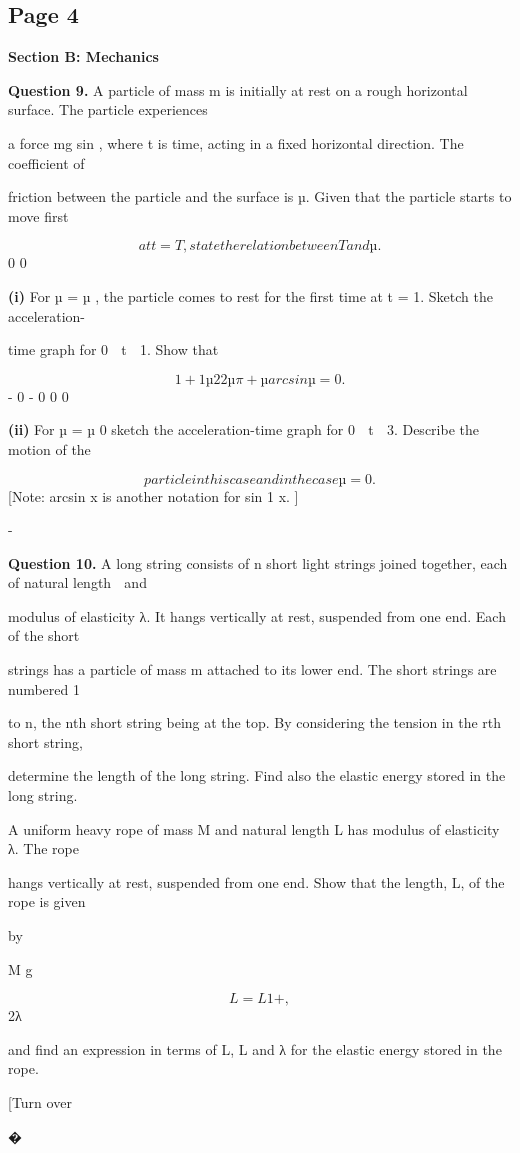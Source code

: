 \documentclass[12pt]{article}
\begin{document}
\subsection*{Page 4}
\begin{flushleft}
\bigskip\textbf{Section B: Mechanics}\par
\bigskip\textbf{Question 9.} A particle of mass m is initially at rest on a rough horizontal surface. The particle experiences\par
a force mg sin \pit, where t is time, acting in a fixed horizontal direction. The coefficient of\par
friction between the particle and the surface is µ. Given that the particle starts to move first\par
\[at t = T , state the relation between T and µ.\]
0 0\par
\textbf{(i)} For µ = µ , the particle comes to rest for the first time at t = 1. Sketch the acceleration-\par
time graph for 0  t  1. Show that\par
\[1 + 1 µ2 2 µ \pi + µ arcsin µ = 0 .\]
- 0 - 0 0 0\par
\textbf{(ii)} For µ = µ 0 sketch the acceleration-time graph for 0  t  3. Describe the motion of the\par
\[particle in this case and in the case µ = 0.\]
[Note: arcsin x is another notation for sin 1 x. ]\par
-\par
\bigskip\textbf{Question 10.} A long string consists of n short light strings joined together, each of natural length  and\par
modulus of elasticity λ. It hangs vertically at rest, suspended from one end. Each of the short\par
strings has a particle of mass m attached to its lower end. The short strings are numbered 1\par
to n, the nth short string being at the top. By considering the tension in the rth short string,\par
determine the length of the long string. Find also the elastic energy stored in the long string.\par
A uniform heavy rope of mass M and natural length L has modulus of elasticity λ. The rope\par
hangs vertically at rest, suspended from one end. Show that the length, L, of the rope is given\par
by\par
M g\par
\[L = L 1 + ,\]
2λ\par
and find an expression in terms of L, L and λ for the elastic energy stored in the rope.\par
[Turn over\par
� \par
 \par
\end{flushleft}
\end{document}
